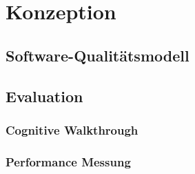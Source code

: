 \section{Konzeption}

\subsection{Software-Qualitätsmodell}
 
\subsection{Evaluation}

\subsubsection{Cognitive Walkthrough}

\subsubsection{Performance Messung}